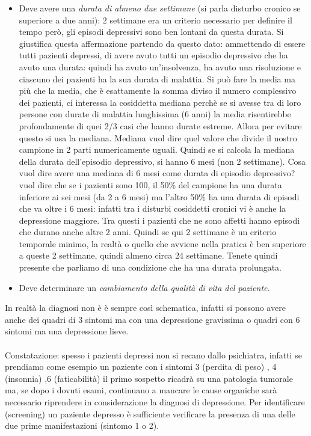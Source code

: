 \begin{itemize}
\item
  Deve avere una \emph{\emph{durata di almeno due settimane}} (si parla
  disturbo cronico se superiore a due anni): 2 settimane era un criterio
  necessario per definire il tempo però, gli episodi depressivi sono ben
  lontani da questa durata. Si giustifica questa affermazione partendo
  da questo dato: ammettendo di essere tutti pazienti depressi, di avere
  avuto tutti un episodio depressivo che ha avuto una durata: quindi ha
  avuto un'insolvenza, ha avuto una risoluzione e ciascuno dei pazienti
  ha la sua durata di malattia. Si può fare la media ma più che la
  media, che è esattamente la somma diviso il numero complessivo dei
  pazienti, ci interessa la cosiddetta mediana perchè se si avesse tra
  di loro persone con durate di malattia lunghissima (6 anni) la media
  risentirebbe profondamente di quei 2/3 casi che hanno durate estreme.
  Allora per evitare questo si usa la mediana. Mediana vuol dire quel
  valore che divide il nostro campione in 2 parti numericamente uguali.
  Quindi se si calcola la mediana della durata dell'episodio depressivo,
  si hanno 6 mesi (non 2 settimane). Cosa vuol dire avere una mediana di
  6 mesi come durata di episodio depressivo? vuol dire che se i pazienti
  sono 100, il 50\% del campione ha una durata inferiore ai sei mesi (da
  2 a 6 mesi) ma l'altro 50\% ha una durata di episodi che va oltre i 6
  mesi: infatti tra i disturbi cosiddetti cronici vi è anche la
  depressione maggiore. Tra questi i pazienti che ne sono affetti hanno
  episodi che durano anche altre 2 anni. Quindi se qui 2 settimane è un
  criterio temporale minimo, la realtà o quello che avviene nella
  pratica è ben superiore a queste 2 settimane, quindi almeno circa 24
  settimane. Tenete quindi presente che parliamo di una condizione che
  ha una durata prolungata.
\item
  Deve determinare un \emph{\emph{cambiamento della qualità di vita del
  paziente.}}
\end{itemize}

In realtà la diagnosi non è è sempre così schematica, infatti si possono
avere anche dei quadri di 3 sintomi ma con una depressione gravissima o
quadri con 6 sintomi ma una depressione lieve.
\\\\
Constatazione: spesso i pazienti depressi non si recano dallo
psichiatra, infatti se prendiamo come esempio un paziente con i sintomi
3 (perdita di peso) , 4 (insonnia) ,6 (faticabilità) il primo sospetto
ricadrà su una patologia tumorale ma, se dopo i dovuti esami, continuano
a mancare le cause organiche sarà necessario riprendere in
considerazione la diagnosi di depressione. Per identificare (screening)
un paziente depresso è sufficiente verificare la presenza di una delle
due prime manifestazioni (sintomo 1 o 2).

